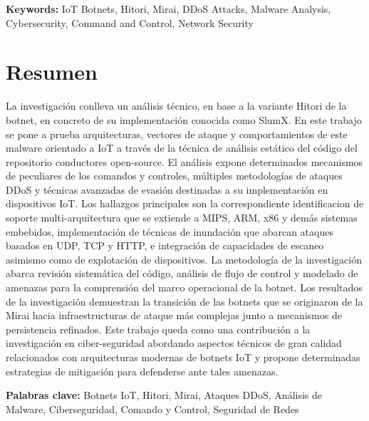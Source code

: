 \documentclass[12pt,letterpaper]{report}
\begin{document}
\textbf{Keywords:} IoT Botnets, Hitori, Mirai, DDoS Attacks, Malware Analysis, Cybersecurity, Command and Control, Network Security

\chapter*{Resumen}

La investigación conlleva un análisis técnico, en base a la variante Hitori de la botnet, en concreto de su implementación conocida como SlumX. En este trabajo se pone a prueba arquitecturas, vectores de ataque y comportamientos de este malware orientado a IoT a través de la técnica de análisis estático del código del repositorio conductores open-source. El análisis expone determinados mecanismos de peculiares de los comandos y controles, múltiples metodologías de ataques DDoS y técnicas avanzadas de evasión destinadas a su implementación en dispositivos IoT. Los hallazgos principales son la correspondiente identificacion de soporte multi-arquitectura que se extiende a MIPS, ARM, x86 y demás sistemas embebidos, implementación de técnicas de inundación que abarcan ataques basados en UDP, TCP y HTTP, e integración de capacidades de escaneo asimismo como de explotación de dispositivos. La metodología de la investigación abarca revisión sistemática del código, análisis de flujo de control y modelado de amenazas para la comprensión del marco operacional de la botnet. Los resultados de la investigación demuestran la transición de las botnets que se originaron de la Mirai hacia infraestructuras de ataque más complejas junto a mecanismos de persistencia refinados. Este trabajo queda como una contribución a la investigación en ciber-seguridad abordando aspectos técnicos de gran calidad relacionados con arquitecturas modernas de botnets IoT y propone determinadas estrategias de mitigación para defenderse ante tales amenazas.

\textbf{Palabras clave:} Botnets IoT, Hitori, Mirai, Ataques DDoS, Análisis de Malware, Ciberseguridad, Comando y Control, Seguridad de Redes

\tableofcontents

\listoftables

\listoffigures

\end{document}

